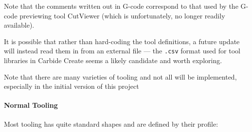 \documentclass{ltxdoc}
\begin{document}
Note that the comments written out in G-code correspond to that used by the G-code previewing tool 
CutViewer (which is unfortunately, no longer readily available).

It is possible that rather than hard-coding the tool definitions, a future update will instead
read them in from an external file --- the \texttt{.csv} format used for tool libraries in 
Carbide Create seems a likely candidate and worth exploring.

Note that there are many varieties of tooling and not all will be implemented, especially in the 
initial version of this project
 
\begin{samepage}
\paragraph{Normal Tooling}

\label{para:normaltooling} Most tooling has quite standard shapes 
and are defined by their profile:


\end{samepage}
\end{document}
